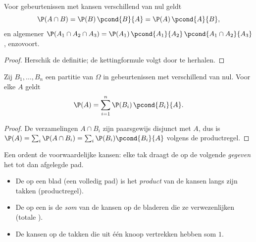 \begin{proposition}[Productregel]\label{prop:g12:condprob:product}
Voor gebeurtenissen met kansen verschillend van nul geldt
\[
\P(A \cap B) = \P(B)\,\pcond{B}{A} = \P(A)\,\pcond{A}{B},
\]
en algemener
$\P(A_1 \cap A_2 \cap A_3) = \P(A_1)\,\pcond{A_1}{A_2}\,
\pcond{A_1 \cap A_2}{A_3}$, enzovoort.
\end{proposition}

\begin{proof}
Herschik de definitie; de kettingformule volgt door te herhalen.
\end{proof}

\begin{theorem}\label{thm:g12:condprob:total}
Zij $B_1, \dots, B_n$ een partitie van $\Omega$ in gebeurtenissen met 
verschillend van nul. Voor elke  $A$ geldt
\[
\P(A) = \sum_{i=1}^{n} \P(B_i)\,\pcond{B_i}{A}.
\]
\end{theorem}

\begin{proof}
De verzamelingen $A \cap B_i$ zijn paarsgewijs disjunct met  $A$,
dus is $\P(A) = \sum_i \P(A \cap B_i) = \sum_i \P(B_i)\pcond{B_i}{A}$ volgens
de productregel.
\end{proof}

\begin{method}\label{met:g12:condprob:tree}
Een  ordent de voorwaardelijke kansen: elke tak draagt de  op
de volgende  \emph{gegeven} het tot dan afgelegde pad.
\begin{itemize}
  \item De  op een blad (een volledig pad) is het \emph{product} van de
        kansen langs zijn takken (productregel).
  \item De  op een  is de \emph{som} van de kansen op de
        bladeren die ze verwezenlijken (totale ).
  \item De kansen op de takken die uit één knoop vertrekken hebben som $1$.
\end{itemize}
\end{method}


